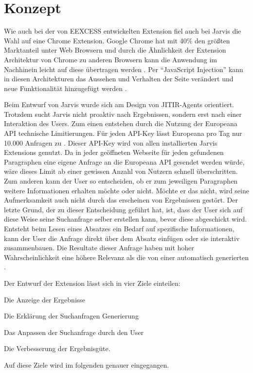 \section{Konzept}
 Wie auch bei der von EEXCESS entwickelten Extension fiel auch bei Jarvis die Wahl auf eine Chrome Extension. Google Chrome hat mit 40\% den größten Marktanteil unter Web Browsern und durch die Ähnlichkeit der Extension Architektur von Chrome zu anderen Browsern kann die Anwendung im Nachhinein leicht auf diese übertragen werden \cite{schlottererweb}. Per ``JavaScript Injection'' kann in diesen Architekturen das Aussehen und Verhalten der Seite verändert und neue Funktionalität hinzugefügt werden \cite{schlottererweb}.

 Beim Entwurf von Jarvis wurde sich am Design von JITIR-Agents orientiert. Trotzdem sucht Jarvis nicht proaktiv nach Ergebnissen, sondern erst nach einer Interaktion des Users. Zum einen entstehen durch die Nutzung der Europeana API technische Limitierungen. Für jeden API-Key lässt Europeana pro Tag nur 10.000 Anfragen zu \cite{europlimit}. Dieser API-Key wird von allen installierten Jarvis Extensions genutzt. Da in jeder geöffneten Webseite für jeden gefundenen Paragraphen eine eigene Anfrage an die Europeana API gesendet werden würde, wäre dieses Limit ab einer gewissen Anzahl von Nutzern schnell überschritten. Zum anderen kann der User so entscheiden, ob er zum jeweiligen Paragraphen weitere Informationen erhalten möchte oder nicht. Möchte er das nicht, wird seine Aufmerksamkeit auch nicht durch das erscheinen von Ergebnissen gestört. Der letzte Grund, der zu dieser Entscheidung geführt hat, ist, dass der User sich auf diese Weise seine Suchanfrage selber erstellen kann, bevor diese abgeschickt wird. Entsteht beim Lesen eines Absatzes ein Bedarf auf spezifische Informationen, kann der User die Anfrage direkt über dem Absatz einfügen oder sie interaktiv zusammenbauen. Die Resultate dieser Anfrage haben mit hoher Wahrscheinlichkeit eine höhere Relevanz als die von einer automatisch generierten \cite{rhodes2000just}.

 Der Entwurf der Extension lässt sich in vier Ziele einteilen:
 \begin{enumerate*}
 	\item Die Anzeige der Ergebnisse
  	\item Die Erklärung der Suchanfragen Generierung
 	\item Das Anpassen der Suchanfrage durch den User
 	\item Die Verbesserung der Ergebnisgüte.
\end{enumerate*}
Auf diese Ziele wird im folgenden genauer eingegangen.

